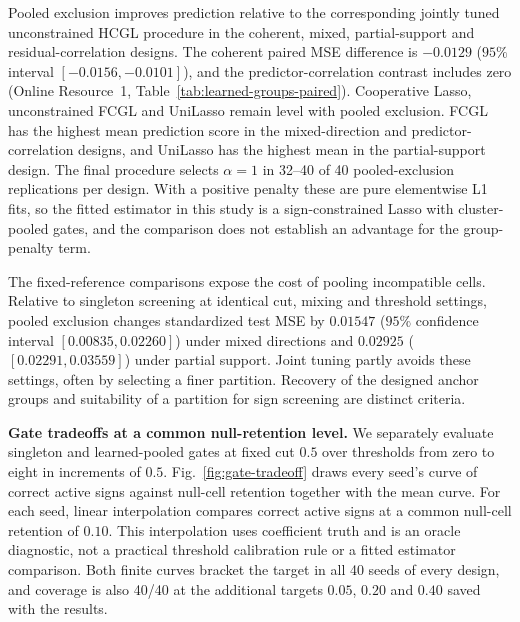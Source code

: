 \documentclass[lineno,pdflatex,sn-basic]{sn-jnl}
\theoremstyle{thmstyleone}
\begin{document}
Pooled exclusion improves prediction relative to the corresponding jointly tuned
unconstrained HCGL procedure in the coherent, mixed, partial-support and
residual-correlation designs. The coherent paired MSE difference is $-0.0129$
($95\%$ interval $[-0.0156,-0.0101]$), and the predictor-correlation contrast
includes zero (Online Resource~1, Table~\ref{tab:learned-groups-paired}).
Cooperative Lasso, unconstrained FCGL and UniLasso remain level with pooled
exclusion. FCGL has the highest mean prediction score in the mixed-direction
and predictor-correlation designs, and UniLasso has the highest mean in the
partial-support design. The final procedure selects $\alpha=1$ in 32--40 of 40
pooled-exclusion replications per design. With a positive penalty these are
pure elementwise L1 fits, so the fitted estimator in this study is a
sign-constrained Lasso with cluster-pooled gates, and the comparison does not
establish an advantage for the group-penalty term.

The fixed-reference comparisons expose the cost of pooling incompatible cells.
Relative to singleton screening at identical cut, mixing and threshold settings,
pooled exclusion changes standardized test MSE by $0.01547$
($95\%$ confidence interval $[0.00835,0.02260]$) under mixed directions and $0.02925$
($[0.02291,0.03559]$) under partial support. Joint tuning partly avoids these
settings, often by selecting a finer partition. Recovery of the designed anchor
groups and suitability of a partition for sign screening are distinct criteria.

\noindent\textbf{Gate tradeoffs at a common null-retention level.}
We separately evaluate singleton and learned-pooled gates at fixed
cut $0.5$ over thresholds from zero to eight in increments of $0.5$.
Fig.~\ref{fig:gate-tradeoff} draws every seed's curve of correct active signs
against null-cell retention together with the mean curve. For each seed,
linear interpolation compares correct active signs at a common
null-cell retention of $0.10$. This interpolation uses coefficient truth and
is an oracle diagnostic, not a practical threshold calibration rule or a fitted
estimator comparison. Both finite curves bracket the target in all 40 seeds
of every design, and coverage is also 40/40 at the additional targets
$0.05$, $0.20$ and $0.40$ saved with the results.
\end{document}
